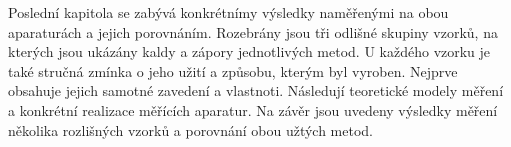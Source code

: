 Poslední kapitola se zabývá konkrétnímy výsledky naměřenými na obou aparaturách a jejich porovnáním. Rozebrány jsou tři odlišné skupiny vzorků, 
na kterých jsou ukázány kaldy a zápory jednotlivých metod. U každého vzorku je také stručná zmínka o jeho užití a způsobu, kterým byl vyroben.
Nejprve obsahuje jejich samotné zavedení a vlastnoti. 
Následují teoretické modely měření a konkrétní realizace měřících aparatur. Na závěr jsou uvedeny výsledky měření několika rozlišných vzorků a porovnání 
obou užtých metod.
